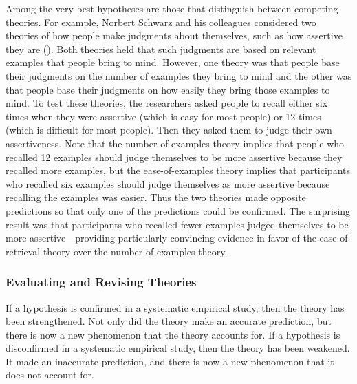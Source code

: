 \documentclass[
]{krantz}
\begin{document}
Among the very best hypotheses are those that distinguish between competing theories. For example, Norbert Schwarz and his colleagues considered two theories of how people make judgments about themselves, such as how assertive they are (). Both theories held that such judgments are based on relevant examples that people bring to mind. However, one theory was that people base their judgments on the number of examples they bring to mind and the other was that people base their judgments on how easily they bring those examples to mind. To test these theories, the researchers asked people to recall either six times when they were assertive (which is easy for most people) or 12 times (which is difficult for most people). Then they asked them to judge their own assertiveness. Note that the number-of-examples theory implies that people who recalled 12 examples should judge themselves to be more assertive because they recalled more examples, but the ease-of-examples theory implies that participants who recalled six examples should judge themselves as more assertive because recalling the examples was easier. Thus the two theories made opposite predictions so that only one of the predictions could be confirmed. The surprising result was that participants who recalled fewer examples judged themselves to be more assertive---providing particularly convincing evidence in favor of the ease-of-retrieval theory over the number-of-examples theory.

\subsubsection*{Evaluating and Revising Theories}\label{evaluating-and-revising-theories}


If a hypothesis is confirmed in a systematic empirical study, then the theory has been strengthened. Not only did the theory make an accurate prediction, but there is now a new phenomenon that the theory accounts for. If a hypothesis is disconfirmed in a systematic empirical study, then the theory has been weakened. It made an inaccurate prediction, and there is now a new phenomenon that it does not account for.
\end{document}
